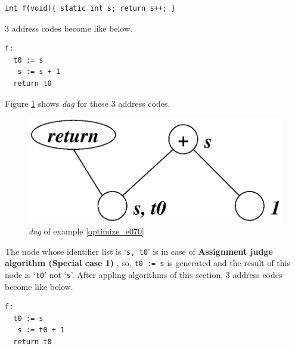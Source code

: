 \begin{Example}
\label{optimize_e070}
\begin{verbatim}
int f(void){ static int s; return s++; }
\end{verbatim}
3 address codes become like below.
\begin{verbatim}
f:
  t0 := s
   s := s + 1
  return t0
\end{verbatim}
Figure \ref{optimize_e071} shows {\em dag} for these 3 address codes.
\begin{figure}[htbp]
\begin{center}
\includegraphics[width=0.8\linewidth,height=0.347\linewidth]{opt029.eps}
\caption{{\em dag} of example \ref{optimize_e070}}
\label{optimize_e071}
\end{center}
\end{figure}
The node whose identifier list is `{\tt{s, t0}}'
is in case of {\bf Assignment judge algorithm (Special case 1) },
so, {\tt{t0 := s}} is generated and the result of this node
is `{\tt{t0}}' not `{\tt{s}}'.
After appling algorithms of this section,
3 address codes become like below.
\begin{verbatim}
f:
  t0 := s
   s := t0 + 1
  return t0
\end{verbatim}
\end{Example}

